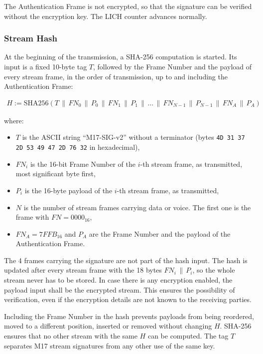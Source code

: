 \documentclass[a4paper,11pt,oneside]{book}
\begin{document}
The Authentication Frame is not encrypted, so that the signature can be verified without the encryption key. The LICH counter advances normally.

\subsubsection{Stream Hash}
At the beginning of the transmission, a SHA-256 computation is started. Its input is a fixed 10-byte tag $T$, followed by the Frame Number and the payload of every stream frame, in the order of transmission, up to and including the Authentication Frame:

\begin{align*}
	H := \mathrm{SHA256}(T \,\|\, FN_0 \,\|\, P_0 \,\|\, FN_1 \,\|\, P_1 \,\|\, \ldots \,\|\, FN_{N-1} \,\|\, P_{N-1} \,\|\, FN_A \,\|\, P_A)
\end{align*}

where:
\begin{itemize}
	\item $T$ is the ASCII string ``M17-SIG-v2'' without a terminator (bytes \texttt{4D 31 37 2D 53 49 47 2D 76 32} in hexadecimal),
	\item $FN_i$ is the 16-bit Frame Number of the $i$-th stream frame, as transmitted, most significant byte first,
	\item $P_i$ is the 16-byte payload of the $i$-th stream frame, as transmitted,
	\item $N$ is the number of stream frames carrying data or voice. The first one is the frame with $FN = 0000_{16}$,
	\item $FN_A = 7FFB_{16}$ and $P_A$ are the Frame Number and the payload of the Authentication Frame.
\end{itemize}

The 4 frames carrying the signature are not part of the hash input. The hash is updated after every stream frame with the 18 bytes $FN_i \,\|\, P_i$, so the whole stream never has to be stored. In case there is any encryption enabled, the payload input shall be the encrypted stream. This ensures the possibility of verification, even if the encryption details are not known to the receiving parties.

Including the Frame Number in the hash prevents payloads from being reordered, moved to a different position, inserted or removed without changing $H$. SHA-256 ensures that no other stream with the same $H$ can be computed. The tag $T$ separates M17 stream signatures from any other use of the same key.
\end{document}
